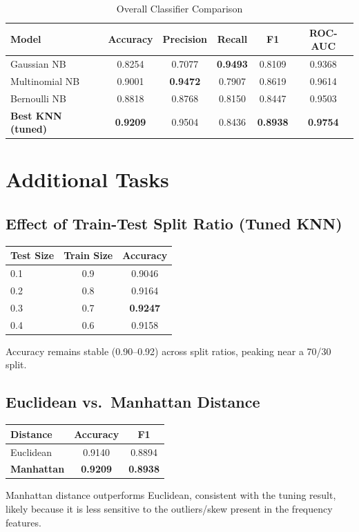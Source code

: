 \documentclass[11pt]{article}
\begin{document}
\begin{table}[H]
\centering
\caption{Overall Classifier Comparison}
\begin{tabular}{lccccc}
\toprule
\textbf{Model} & \textbf{Accuracy} & \textbf{Precision} & \textbf{Recall} & \textbf{F1} & \textbf{ROC-AUC} \\
\midrule
Gaussian NB           & 0.8254 & 0.7077 & \textbf{0.9493} & 0.8109 & 0.9368 \\
Multinomial NB        & 0.9001 & \textbf{0.9472} & 0.7907 & 0.8619 & 0.9614 \\
Bernoulli NB          & 0.8818 & 0.8768 & 0.8150 & 0.8447 & 0.9503 \\
\textbf{Best KNN (tuned)} & \textbf{0.9209} & 0.9504 & 0.8436 & \textbf{0.8938} & \textbf{0.9754} \\
\bottomrule
\end{tabular}
\end{table}

\section{Additional Tasks}

\subsection{Effect of Train-Test Split Ratio (Tuned KNN)}
\begin{table}[H]
\centering
\begin{tabular}{lcc}
\toprule
\textbf{Test Size} & \textbf{Train Size} & \textbf{Accuracy} \\
\midrule
0.1 & 0.9 & 0.9046 \\
0.2 & 0.8 & 0.9164 \\
0.3 & 0.7 & \textbf{0.9247} \\
0.4 & 0.6 & 0.9158 \\
\bottomrule
\end{tabular}
\end{table}
Accuracy remains stable (0.90--0.92) across split ratios, peaking near a 70/30 split.

\subsection{Euclidean vs.\ Manhattan Distance}
\begin{table}[H]
\centering
\begin{tabular}{lcc}
\toprule
\textbf{Distance} & \textbf{Accuracy} & \textbf{F1} \\
\midrule
Euclidean  & 0.9140 & 0.8894 \\
\textbf{Manhattan} & \textbf{0.9209} & \textbf{0.8938} \\
\bottomrule
\end{tabular}
\end{table}
Manhattan distance outperforms Euclidean, consistent with the tuning result, likely
because it is less sensitive to the outliers/skew present in the frequency features.
\end{document}
